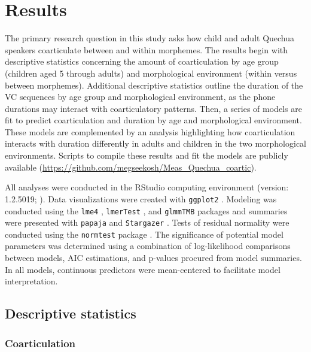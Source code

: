 \documentclass[a4paper,man,floatsintext,natbib,donotrepeattitle, apacite]{apa6}
\begin{document}
\section{Results}

The primary research question in this study asks how child and adult Quechua speakers coarticulate between and within morphemes. The results begin with descriptive statistics concerning the amount of coarticulation by age group (children aged 5 through adults) and morphological environment (within versus between morphemes). Additional descriptive statistics outline the duration of the VC sequences by age group and morphological environment, as the phone durations may interact with coarticulatory patterns. Then, a series of models are fit to predict coarticulation and duration by age and morphological environment. These models are complemented by an analysis highlighting how coarticulation interacts with duration differently in adults and children in the two morphological environments. Scripts to compile these results and fit the models are publicly available (\url{https://github.com/megseekosh/Meas_Quechua_coartic}). 

All analyses were conducted in the RStudio computing environment (version: 1.2.5019; \cite{rstudioteamRStudioIntegratedDevelopment2020}). Data visualizations were created with \texttt{ggplot2} \citep{wickhamGgplot2ElegantGraphics2016}. Modeling was conducted using the \texttt{lme4} \citep{batesFittingLinearMixedeffects2015}, \texttt{lmerTest} \citep{kuznetsovaLmerTestPackageTests2017}, and \texttt{glmmTMB} \citep{brooksGlmmTMBBalancesSpeed2017} packages and summaries were presented with \texttt{papaja} \citep{papaja-cite} and \texttt{Stargazer} \citep{hlavacStargazerWellFormattedRegression2018}. Tests of residual normality were conducted using the \texttt{normtest} package \citep{gavrilovNormtestTestsNormality2014}. The significance of potential model parameters was determined using a combination of log-likelihood comparisons between models, AIC estimations, and p-values procured from model summaries. In all models, continuous predictors were mean-centered to facilitate model interpretation.


\subsection{Descriptive statistics}\label{descriptive-statistics}


\subsubsection{Coarticulation}\label{coarticulation}
\end{document}
